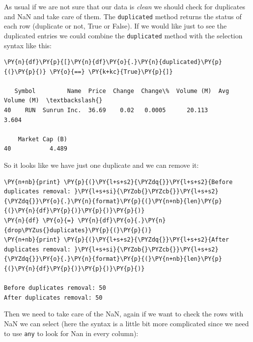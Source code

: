 \begin{Answer}
As usual if we are not sure that our data is \emph{clean} we should check for duplicates and NaN and take care of them. The \texttt{duplicated} method returns the status of each row (duplicate or not, True or False). If we would like just to see the duplicated entries we could combine the \texttt{duplicated} method with the selection syntax like this:

\begin{tcolorbox}[size=fbox, boxrule=1pt, colback=cellbackground, colframe=cellborder]
\begin{Verbatim}[commandchars=\\\{\}]
\PY{n}{df}\PY{p}{[}\PY{n}{df}\PY{o}{.}\PY{n}{duplicated}\PY{p}{(}\PY{p}{)} \PY{o}{==} \PY{k+kc}{True}\PY{p}{]}

   Symbol         Name  Price  Change  Change\%  Volume (M)  Avg Volume (M)  \textbackslash{}
40    RUN  Sunrun Inc.  36.69    0.02   0.0005      20.113           3.604

    Market Cap (B)
40           4.489
\end{Verbatim}
\end{tcolorbox}
        
So it looks like we have just one duplicate and we can remove it:

\begin{tcolorbox}[size=fbox, boxrule=1pt, colback=cellbackground, colframe=cellborder]
\begin{Verbatim}[commandchars=\\\{\}]
\PY{n+nb}{print} \PY{p}{(}\PY{l+s+s2}{\PYZdq{}}\PY{l+s+s2}{Before duplicates removal: }\PY{l+s+si}{\PYZob{}\PYZcb{}}\PY{l+s+s2}{\PYZdq{}}\PY{o}{.}\PY{n}{format}\PY{p}{(}\PY{n+nb}{len}\PY{p}{(}\PY{n}{df}\PY{p}{)}\PY{p}{)}\PY{p}{)}
\PY{n}{df} \PY{o}{=} \PY{n}{df}\PY{o}{.}\PY{n}{drop\PYZus{}duplicates}\PY{p}{(}\PY{p}{)}
\PY{n+nb}{print} \PY{p}{(}\PY{l+s+s2}{\PYZdq{}}\PY{l+s+s2}{After duplicates removal: }\PY{l+s+si}{\PYZob{}\PYZcb{}}\PY{l+s+s2}{\PYZdq{}}\PY{o}{.}\PY{n}{format}\PY{p}{(}\PY{n+nb}{len}\PY{p}{(}\PY{n}{df}\PY{p}{)}\PY{p}{)}\PY{p}{)}

Before duplicates removal: 50
After duplicates removal: 50
\end{Verbatim}
\end{tcolorbox}

Then we need to take care of the NaN, again if we want to check the rows with NaN we can select (here the syntax is a little bit more complicated since we need to use \texttt{any} to look for Nan in every column):


\end{Answer}
